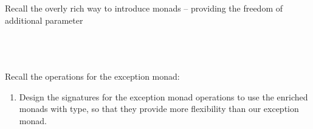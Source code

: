\documentclass{article}
\begin{document}
\begin{exercise}
  Recall the overly rich way to introduce monads -- providing the freedom of
  additional parameter\\
  {}{}{\hlopt{=
  }}{}{\hlendline{}}\\
  {\hlstd{ \ }}{}{\hlopt{(}}{}{\hlopt{,
  }}{}{\hlopt{) }}{}{}{}{\hlopt{: }}{}{\hlopt{->
  (}}{}{\hlopt{, }}{}{\hlopt{) }}{}{}{}{\hlopt{:}}{\hlendline{}}\\
  {\hlstd{ \ \ \ }}{\hlopt{(}}{}{\hlopt{, }}{}{\hlopt{)
  }}{}{\hlopt{-> (}}{}{\hlopt{-> (}}{}{\hlopt{,
  }}{}{\hlopt{) }}{}{\hlopt{) -> (}}{}{\hlopt{,
  }}{}{\hlopt{) }}{}{\hlendline{}}\\
  {}
  
  Recall the operations for the exception monad:\\
  {}{}{\hlopt{: }}{}{\hlopt{->
  }}{}{}{}{\hlopt{: }}{}{\hlopt{->
  (}}{}{\hlopt{-> }}{}{\hlopt{) -> }}{}{\hlendline{}}
  \begin{enumerate}
    \item Design the signatures for the exception monad operations to use the
    enriched monads with {\hlopt{(}}{}{\hlopt{,
    }}{}{\hlopt{) }}{} type, so that they provide more
    flexibility than our exception monad.
    

\end{enumerate}
\end{exercise}
\end{document}
